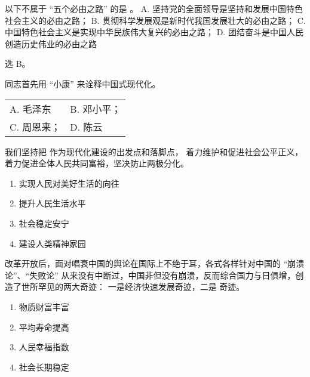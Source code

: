 \documentclass[UTF8,10pt]{ctexbook} %
\begin{document}
\begin{example}
    以下不属于 “五个必由之路” 的是 \underline{\qquad \qquad \qquad}。
    \newline
    A. 坚持党的全面领导是坚持和发展中国特色社会主义的必由之路；
    \newline
    B. 贯彻科学发展观是新时代我国发展壮大的必由之路；
    \newline
    C. 中国特色社会主义是实现中华民族伟大复兴的必由之路；
    \newline
    D. 团结奋斗是中国人民创造历史伟业的必由之路
    \begin{sol}
        选 B。
    \end{sol}
\end{example}

\begin{example}
    \underline{\qquad \qquad \qquad} 同志首先用 “小康” 来诠释中国式现代化。
    \newline
    \begin{tabular}{p{} p{}}
    A. 毛泽东 & B. 邓小平； \\
    C. 周恩来； & D. 陈云
    \end{tabular}
\end{example}

\begin{example}
    我们坚持把 \underline{\qquad \qquad \qquad} 作为现代化建设的出发点和落脚点，
    着力维护和促进社会公平正义，着力促进全体人民共同富裕，坚决防止两极分化。
    \begin{enumerate}[itemsep=0pt, label=\Alph*.]
    \item 实现人民对美好生活的向往
    \item 提升人民生活水平
    \item 社会稳定安宁
    \item 建设人类精神家园
    \end{enumerate}
\end{example}

\begin{example}
    改革开放后，面对唱衰中国的舆论在国际上不绝于耳，各式各样针对中国的 “崩溃论”、“失败论”
    从来没有中断过，中国非但没有崩溃，反而综合国力与日俱增，创造了世所罕见的两大奇迹：
    一是经济快速发展奇迹，二是 \underline{\qquad \qquad \qquad} 奇迹。
    \begin{enumerate}[itemsep=0pt, label=\Alph*.]
    \item 物质财富丰富
    \item 平均寿命提高
    \item 人民幸福指数
    \item 社会长期稳定
    \end{enumerate}
\end{example}
\end{document}
